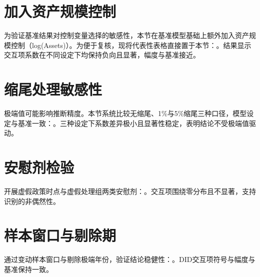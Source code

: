 \section{加入资产规模控制}
为验证基准结果对控制变量选择的敏感性，本节在基准模型基础上额外加入资产规模控制（log(Assets)）。为便于复核，现将代表性表格直接置于本节：。结果显示交互项系数在不同设定下均保持负向且显著，幅度与基准接近。

\section{缩尾处理敏感性}
\label{sec:robustness_winsorize_in_ch5}
极端值可能影响推断精度。本节系统比较无缩尾、1\%与5\%缩尾三种口径，模型设定与基准一致：。三种设定下系数差异极小且显著性稳定，表明结论不受极端值驱动。

\section{安慰剂检验}
\label{sec:robustness_placebo_in_ch5}
开展虚假政策时点与虚假处理组两类安慰剂：。交互项围绕零分布且不显著，支持识别的非偶然性。

\section{样本窗口与剔除期}
\label{sec:robustness_window_in_ch5}
通过变动样本窗口与剔除极端年份，验证结论稳健性：。DID交互项符号与幅度与基准保持一致。